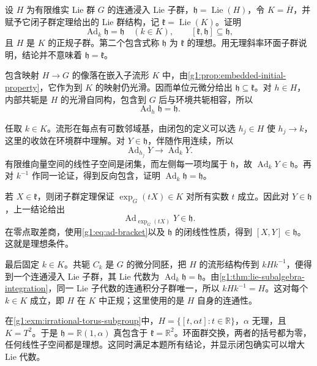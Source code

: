\begin{exercise}\label{g1:ex:connected-subgroup-normal-in-closure}
	设 \(H\) 为有限维实 Lie 群 \(G\) 的连通浸入 Lie 子群，\(\mathfrak h=\operatorname{Lie}(H)\)，令 \(K=\overline H\)，并赋予它闭子群定理给出的 Lie 群结构，记 \(\mathfrak k=\operatorname{Lie}(K)\)。证明
	\[
		\operatorname{Ad}_k\mathfrak h=\mathfrak h\quad(k\in K),
		\qquad[\mathfrak k,\mathfrak h]\subseteq\mathfrak h,
	\]
	且 \(H\) 是 \(K\) 的正规子群。第二个包含式称 \(\mathfrak h\) 为 \(\mathfrak k\) 的理想。用无理斜率环面子群说明，结论并不意味着 \(\mathfrak h=\mathfrak k\)。
\end{exercise}
\begin{solution}
	包含映射 \(H\to G\) 的像落在嵌入子流形 \(K\) 中，由\cref{g1:prop:embedded-initial-property}，它作为到 \(K\) 的映射仍光滑。因而单位元微分给出 \(\mathfrak h\subseteq\mathfrak k\)。对 \(h\in H\)，内部共轭是 \(H\) 的光滑自同构，包含到 \(G\) 后与环境共轭相容，所以
	\[
		\operatorname{Ad}_h\mathfrak h=\mathfrak h.
	\]

	任取 \(k\in K\)。流形在每点有可数邻域基，由闭包的定义可以选 \(h_j\in H\) 使 \(h_j\to k\)，这里的收敛在环境群中理解。对 \(Y\in\mathfrak h\)，伴随作用连续，所以
	\[
		\operatorname{Ad}_{h_j}Y\longrightarrow\operatorname{Ad}_kY.
	\]
	有限维向量空间的线性子空间是闭集，而左侧每一项均属于 \(\mathfrak h\)，故 \(\operatorname{Ad}_kY\in\mathfrak h\)。再对 \(k^{-1}\) 作同一论证，得到反向包含，证明 \(\operatorname{Ad}_k\mathfrak h=\mathfrak h\)。

	若 \(X\in\mathfrak k\)，则闭子群定理保证 \(\exp_G(tX)\in K\) 对所有实数 \(t\) 成立。因此对 \(Y\in\mathfrak h\)，上一结论给出
	\[
		\operatorname{Ad}_{\exp_G(tX)}Y\in\mathfrak h.
	\]
	在零点取差商，使用\eqref{g1:eq:ad-bracket}以及 \(\mathfrak h\) 的闭线性性质，得到 \([X,Y]\in\mathfrak h\)。这就是理想条件。

	最后固定 \(k\in K\)。共轭 \(C_k\) 是 \(G\) 的微分同胚，把 \(H\) 的流形结构传到 \(kHk^{-1}\)，便得到一个连通浸入 Lie 子群，其 Lie 代数为 \(\operatorname{Ad}_k\mathfrak h=\mathfrak h\)。由\cref{g1:thm:lie-subalgebra-integration}，同一 Lie 子代数的连通积分子群唯一，所以 \(kHk^{-1}=H\)。这对每个 \(k\in K\) 成立，即 \(H\) 在 \(K\) 中正规；这里使用的是 \(H\) 自身的连通性。

	在\cref{g1:exm:irrational-torus-subgroup}中，\(H=\{[t,\alpha t]:t\in\mathbb R\}\)，\(\alpha\) 无理，且 \(K=T^2\)。于是 \(\mathfrak h=\mathbb R(1,\alpha)\) 真包含于 \(\mathfrak k=\mathbb R^2\)。环面群交换，两者的括号都为零，任何线性子空间都是理想。这同时满足本题所有结论，并显示闭包确实可以增大 Lie 代数。
\end{solution}

